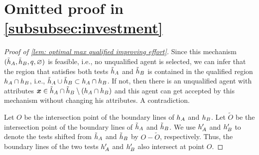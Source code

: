 \section{Omitted proof in \cref{subsubsec:investment}}\label{appendix: seq general cost}


\begin{proof}[Proof of \cref{lem: optimal max qualified improving effort}]
    Since this mechanism $(\tilde {h}_A, \tilde {h}_B,q,\varnothing)$ is feasible, i.e., no unqualified agent is selected, we can infer that the region that satisfies both tests $\tilde {h}_A$ and $\tilde {h}_B$ is contained in the qualified region $h_A \cap h_B$, i.e., $\tilde {h}_A\cup\tilde {h}_B\subset h_A \cap h_B$. If not, then there is an unqualified agent with attributes $\boldsymbol{x} \in \tilde{h}_A \cap \tilde{h}_B \setminus (h_A \cap h_B)$ and this agent can get accepted by this mechanism without changing his attributes. A contradiction.
    
    Let $O$ be the intersection point of the boundary lines of $h_A$ and $h_B$.
    Let $\tilde O$ be the intersection point of  the boundary lines of $\tilde {h}_A$ and $ \tilde {h}_B$. 
    We use $h_A'$ and $h_B'$ to denote the tests shifted from $\tilde{h}_A$ and $\tilde{h}_B$ by $O - \tilde O$, respectively. 
    Thus, the boundary lines of the two tests $h_A'$ and $h_B'$ also intersect at point $O$. 
    

\end{proof}
